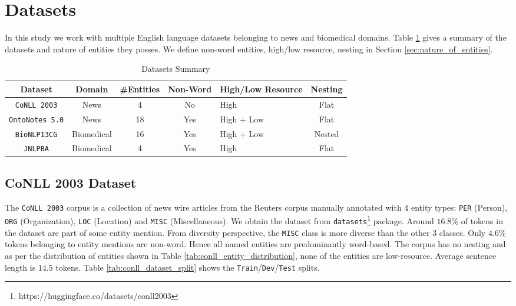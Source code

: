 \section{Datasets}
\label{sec:datasets}
In this study we work with multiple English language datasets belonging to news and biomedical domains. Table \ref{tab:datasets_summary} gives a summary of the datasets and nature of entities they posses. We define non-word entities, high/low resource, nesting in Section \ref{sec:nature_of_entities}.

\begin{table}[h!]
	\begin{tabular}{|c|c|c|c|p{6em}|c|}\hline
	\textbf{Dataset} & \textbf{Domain} & \textbf{\#Entities} & \textbf{Non-Word} & \textbf{High/Low Resource} & \textbf{Nesting}\\\hline
	\texttt{CoNLL 2003} & News & 4 & No & High & Flat\\\hline
	\texttt{OntoNotes 5.0} & News & 18 & Yes & High + Low & Flat\\\hline
	\texttt{BioNLP13CG} & Biomedical & 16 & Yes & High + Low & Nested\\\hline
	\texttt{JNLPBA} & Biomedical & 4 & Yes & High & Flat\\\hline
	\end{tabular}
	\caption{Datasets Summary}
	\label{tab:datasets_summary}
\end{table}

\subsection{CoNLL 2003 Dataset}

The \texttt{CoNLL 2003}\cite{sang2003introduction} corpus is a collection of news wire articles from the Reuters corpus manually annotated with 4 entity types: \texttt{PER} (Person), \texttt{ORG} (Organization), \texttt{LOC} (Location) and \texttt{MISC} (Miscellaneous). We obtain the dataset from \texttt{datasets}\footnote{https://huggingface.co/datasets/conll2003} package. Around $16.8\%$ of tokens in the dataset are part of some entity mention. From diversity perspective, the \texttt{MISC} class is more diverse than the other 3 classes. Only $4.6\%$ tokens belonging to entity mentions are non-word. Hence all named entities are predominantly word-based. The corpus has no nesting and as per the distribution of entities shown in Table \ref{tab:conll_entity_distribution}, none of the entities are low-resource. Average sentence length is $14.5$ tokens. Table \ref{tab:conll_dataset_split} shows the \texttt{Train}/\texttt{Dev}/\texttt{Test} splits. 

